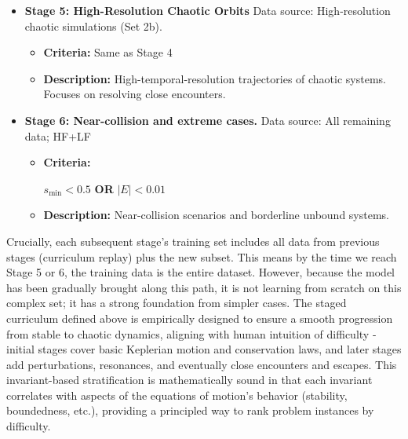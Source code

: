 \documentclass{article}
\begin{document}
\begin{itemize}
    \item \textbf{Stage 5: High-Resolution Chaotic Orbits}
    Data source: High-resolution chaotic simulations (Set 2b).
    
    \begin{itemize}
        \item \textbf{Criteria:} Same as Stage 4
        \item \textbf{Description:} High-temporal-resolution trajectories of chaotic systems. Focuses on resolving close encounters.
    \end{itemize}


    \item \textbf{Stage 6: Near-collision and extreme cases.} 
    Data source: All remaining data; HF+LF 
    
    \begin{itemize}  
        \item \textbf{Criteria:}
        
        $s_{\min} < 0.5$ \textbf{OR} $|E| < 0.01$
  
        \item \textbf{Description:} Near-collision scenarios and borderline unbound systems.
    \end{itemize}

\end{itemize}



Crucially, each subsequent stage's training set includes all data from previous stages (curriculum replay) plus the new subset.  
This means by the time we reach Stage 5 or 6, the training data is the entire dataset.  
However, because the model has been gradually brought along this path, it is not learning from scratch on this complex set;  
it has a strong foundation from simpler cases. The staged curriculum defined above is empirically designed to ensure a smooth 
progression from stable to chaotic dynamics, aligning with human intuition of difficulty - initial stages cover basic Keplerian 
motion and conservation laws, and later stages add perturbations, resonances, and eventually close encounters and escapes.  
This invariant-based stratification is mathematically sound in that each invariant correlates with aspects of the equations 
of motion's behavior (stability, boundedness, etc.), providing a principled way to rank problem instances by difficulty. 
\end{document}

